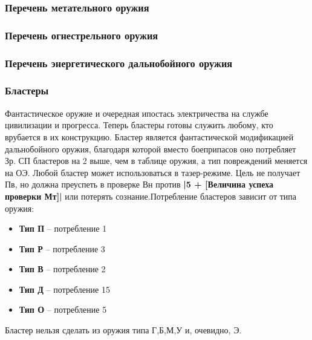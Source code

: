 
\newpage
\subsubsection{Перечень метательного оружия}

\newpage
\subsubsection{Перечень огнестрельного оружия}

\newpage
\subsubsection{Перечень энергетического дальнобойного оружия}

\newpage
\subsubsection{Бластеры}
Фантастическое оружие и очередная ипостась электричества на службе цивилизации и прогресса. Теперь бластеры готовы служить любому, кто врубается в их конструкцию.
\newline Бластер является фантастической модификацией дальнобойного оружия, благодаря которой вместо боеприпасов оно потребляет Зр. СП бластеров на 2 выше, чем в таблице оружия, а тип повреждений меняется на ОЭ.
\newline Любой бластер может использоваться в тазер-режиме. Цель не получает Пв, но должна преуспеть в проверке Вн против \textbf{|5 + [Величина успеха проверки Мт]|} или потерять сознание.\newline Потребление бластеров зависит от типа оружия:
\begin{itemize}
\item \textbf{Тип П} -- потребление 1
\item \textbf{Тип Р} -- потребление 3
\item \textbf{Тип В} -- потребление 2
\item \textbf{Тип Д} -- потребление 15
\item \textbf{Тип О} -- потребление 5
\end{itemize}
Бластер нельзя сделать из оружия типа Г,Б,М,У и, очевидно, Э.%

\printindex[weapons]



